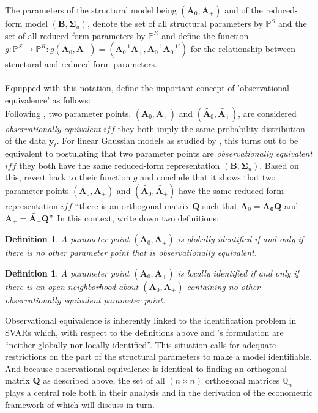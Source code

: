 \documentclass[a4paper,11pt,listof=nochaptergap,oneside,pointednumbers,bibtotoc,bigheadings,liststotoc]{scrbook}
\theoremstyle{mysatz}
\theoremstyle{mydefinition}
\newtheorem{defi}[satz]{Definition}
\theoremstyle{mybemerkung}
\newcommand{\vect}[1]{\boldsymbol{\mathbf{#1}}}
\begin{document}
The parameters of the structural model being $(\vect{A}_0, \vect{A}_+)$ and of the reduced-form model $(\vect{B}, \vect{\Sigma}_u)$, \citet{rubioetal:10} denote the set of all structural parameters by $\mathbb{P}^S$ and the set of all reduced-form parameters by $\mathbb{P}^R$ and define the function $g: \mathbb{P}^S \to \mathbb{P}^R: g(\vect{A}_0, \vect{A}_+) = (\vect{A}_0^{-1}\vect{A}_+, \vect{A}_0^{-1}\vect{A}_0^{-1'})$ for the relationship between structural and reduced-form parameters.\\
\\
Equipped with this notation, \citet{rubioetal:10} define the important concept of 'observational equivalence' as follows: \\
Following \citet{rothenberg:71}, two parameter points, $(\vect{A}_0, \vect{A}_+)$ and $(\widetilde{\vect{A}_0}, \widetilde{\vect{A}_+})$, are considered \textit{observationally equivalent} $iff$ they both imply the same probability distribution of the data $\vect{y}_t$. For linear Gaussian models as studied by \citet{rubioetal:10}, this turns out to be equivalent to postulating that two parameter points are \textit{observationally equivalent} $iff$ they both have the same reduced-form representation $(\vect{B}, \vect{\Sigma}_u)$. Based on this, \citet{rubioetal:10} revert back to their function $g$ and conclude that it shows that two parameter points $(\vect{A}_0, \vect{A}_+)$ and $(\widetilde{\vect{A}_0}, \widetilde{\vect{A}_+})$ have the same reduced-form representation $iff$ ``there is an orthogonal matrix $\vect{Q}$ such that $\vect{A}_0 = \vect{\widetilde{\vect{A}_0}}\vect{Q}$ and $\vect{A}_+ = \widetilde{\vect{A}_+} \vect{Q}$''. In this context, \citet{rubioetal:10} write down two definitions:\\
\begin{defi}
A parameter point $(\vect{A}_0, \vect{A}_+)$ is globally identified if and only if there is no other parameter point that is observationally equivalent.
\end{defi}
\begin{defi}
A parameter point $(\vect{A}_0, \vect{A}_+)$ is locally identified if and only if there is an open neighborhood about $(\vect{A}_0, \vect{A}_+)$ containing no other observationally equivalent parameter point.
\end{defi}

Observational equivalence is inherently linked to the identification problem in SVARs which, with respect to the definitions above and \citet{rubioetal:10}'s formulation are ``neither globally nor locally identified''. This situation calls for adequate restrictions on the part of the structural parameters to make a model identifiable. And because observational equivalence is identical to finding an orthogonal matrix $\vect{Q}$ as described above, the set of all $(n \times n)$ orthogonal matrices $\mathbb{Q}_n$ plays a central role both in their analysis and in the derivation of the econometric framework of \citet{ludvigsonetal:18} which will discuss in turn.
	
\end{document}
